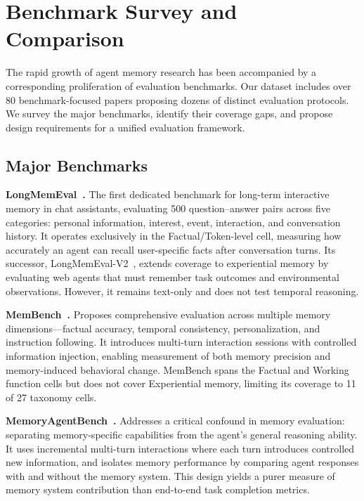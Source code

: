 \section{Benchmark Survey and Comparison}
\label{sec:benchmarks}

The rapid growth of agent memory research has been accompanied by a corresponding proliferation of evaluation benchmarks. Our dataset includes over 80 benchmark-focused papers proposing dozens of distinct evaluation protocols. We survey the major benchmarks, identify their coverage gaps, and propose design requirements for a unified evaluation framework.

\subsection{Major Benchmarks}

\textbf{LongMemEval~\cite{Wu2024LongMemEval}.} The first dedicated benchmark for long-term interactive memory in chat assistants, evaluating 500 question--answer pairs across five categories: personal information, interest, event, interaction, and conversation history. It operates exclusively in the Factual/Token-level cell, measuring how accurately an agent can recall user-specific facts after conversation turns. Its successor, LongMemEval-V2~\cite{Unknown2026LongMemEvalV2}, extends coverage to experiential memory by evaluating web agents that must remember task outcomes and environmental observations. However, it remains text-only and does not test temporal reasoning.

\textbf{MemBench~\cite{Tan2025MemBench}.} Proposes comprehensive evaluation across multiple memory dimensions---factual accuracy, temporal consistency, personalization, and instruction following. It introduces multi-turn interaction sessions with controlled information injection, enabling measurement of both memory precision and memory-induced behavioral change. MemBench spans the Factual and Working function cells but does not cover Experiential memory, limiting its coverage to 11 of 27 taxonomy cells.

\textbf{MemoryAgentBench~\cite{Unknown2025MemoryAgentBench}.} Addresses a critical confound in memory evaluation: separating memory-specific capabilities from the agent's general reasoning ability. It uses incremental multi-turn interactions where each turn introduces controlled new information, and isolates memory performance by comparing agent responses with and without the memory system. This design yields a purer measure of memory system contribution than end-to-end task completion metrics.

